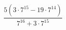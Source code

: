 \begin{ex}[type=calculate]
	\begin{condition}
		\( \dfrac{5(3\cdot7^{15}-19\cdot7^{14})}{7^{16}+3\cdot7^{15}} \)
	\end{condition}
\end{ex}
